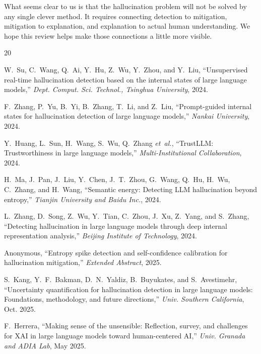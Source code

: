 \documentclass[journal]{IEEEtran}
\begin{document}
What seems clear to us is that the hallucination problem will not be solved by any single clever method. It requires connecting detection to mitigation, mitigation to explanation, and explanation to actual human understanding. We hope this review helps make those connections a little more visible.


\begin{thebibliography}{20}

W.~Su, C.~Wang, Q.~Ai, Y.~Hu, Z.~Wu, Y.~Zhou, and Y.~Liu, ``Unsupervised real-time hallucination detection based on the internal states of large language models,'' \emph{Dept. Comput. Sci. Technol., Tsinghua University}, 2024.

F.~Zhang, P.~Yu, B.~Yi, B.~Zhang, T.~Li, and Z.~Liu, ``Prompt-guided internal states for hallucination detection of large language models,'' \emph{Nankai University}, 2024.

Y.~Huang, L.~Sun, H.~Wang, S.~Wu, Q.~Zhang \emph{et~al.}, ``TrustLLM: Trustworthiness in large language models,'' \emph{Multi-Institutional Collaboration}, 2024.

H.~Ma, J.~Pan, J.~Liu, Y.~Chen, J.~T.~Zhou, G.~Wang, Q.~Hu, H.~Wu, C.~Zhang, and H.~Wang, ``Semantic energy: Detecting LLM hallucination beyond entropy,'' \emph{Tianjin University and Baidu Inc.}, 2024.

L.~Zhang, D.~Song, Z.~Wu, Y.~Tian, C.~Zhou, J.~Xu, Z.~Yang, and S.~Zhang, ``Detecting hallucination in large language models through deep internal representation analysis,'' \emph{Beijing Institute of Technology}, 2024.

Anonymous, ``Entropy spike detection and self-confidence calibration for hallucination mitigation,'' \emph{Extended Abstract}, 2025.

S.~Kang, Y.~F.~Bakman, D.~N.~Yaldiz, B.~Buyukates, and S.~Avestimehr, ``Uncertainty quantification for hallucination detection in large language models: Foundations, methodology, and future directions,'' \emph{Univ. Southern California}, Oct. 2025.

F.~Herrera, ``Making sense of the unsensible: Reflection, survey, and challenges for XAI in large language models toward human-centered AI,'' \emph{Univ. Granada and ADIA Lab}, May 2025.


\end{thebibliography}
\end{document}
